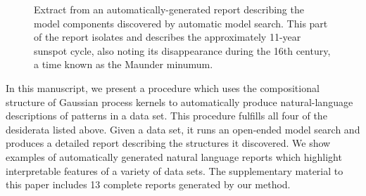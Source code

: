 \documentclass[letterpaper]{article}
\def\ie{i.e.\ }
\begin{document}
\begin{figure}[t]
\centering
{}
\caption{Extract from an automatically-generated report describing the model components discovered by automatic model search.  This part of the report isolates and describes the approximately 11-year sunspot cycle, also noting its disappearance during the 16th century, a time known as the Maunder minumum.}
\label{fig:periodic}
\end{figure}


In this manuscript, we present a procedure which uses the compositional structure of Gaussian process kernels to automatically produce natural-language descriptions of patterns in a data set.
This procedure fulfills all four of the desiderata listed above.
Given a data set, it runs an open-ended model search and produces a detailed report describing the structures it discovered. %
%
We show examples of automatically generated natural language reports which highlight interpretable features of a variety of data sets.
The supplementary material to this paper includes 13 complete reports generated by our method.
\end{document}
